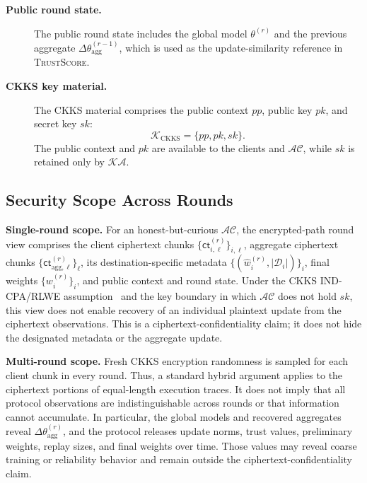 \documentclass{article}
\begin{document}
\begin{description}
  \item[\textbf{Public round state.}]
  The public round state includes the global model $\theta^{(r)}$ and the
  previous aggregate $\Delta\theta_{\mathrm{agg}}^{(r-1)}$, which is used as
  the update-similarity reference in \textsc{TrustScore}.

  \item[\textbf{CKKS key material.}]
  The CKKS material comprises the public context $pp$, public key
  $pk$, and secret key $sk$:
  \[
  \mathcal{K}_{\mathrm{CKKS}}
  =
  \{pp,pk,sk\}.
  \]
  The public context and $pk$ are available to the clients and
  $\mathcal{AC}$, while $sk$ is retained only by $\mathcal{KA}$.

\end{description}

\subsection{Security Scope Across Rounds}\label{sec:supp_security_scope}

\noindent\textbf{Single-round scope.}
For an honest-but-curious $\mathcal{AC}$, the encrypted-path round view comprises
the client ciphertext chunks
$\{\mathsf{ct}_{i,\ell}^{(r)}\}_{i,\ell}$, aggregate ciphertext chunks
$\{\mathsf{ct}_{\mathrm{agg},\ell}^{(r)}\}_{\ell}$, its destination-specific
metadata $\{(\hat w_i^{(r)},|\mathcal D_i|)\}_i$, final weights
$\{w_i^{(r)}\}_i$, and public context and round state. Under the CKKS
IND-CPA/RLWE assumption~\cite{cheon2017ckks,peikertlattice2014} and the key
boundary in which $\mathcal{AC}$ does not
hold $sk$, this view does not enable recovery of an individual plaintext update
from the ciphertext observations. This is a ciphertext-confidentiality claim;
it does not hide the designated metadata or the aggregate update.

\noindent\textbf{Multi-round scope.}
Fresh CKKS encryption randomness is sampled for each client chunk in every
round. Thus, a standard hybrid argument applies to the ciphertext portions of
equal-length execution traces. It does not imply that all protocol observations
are indistinguishable across rounds or that information cannot accumulate. In
particular, the global models and recovered aggregates reveal
$\Delta\theta_{\mathrm{agg}}^{(r)}$, and the protocol releases update norms,
trust values, preliminary weights, replay sizes, and final weights over time.
Those values may reveal coarse training or reliability behavior and remain
outside the ciphertext-confidentiality claim.
\end{document}
